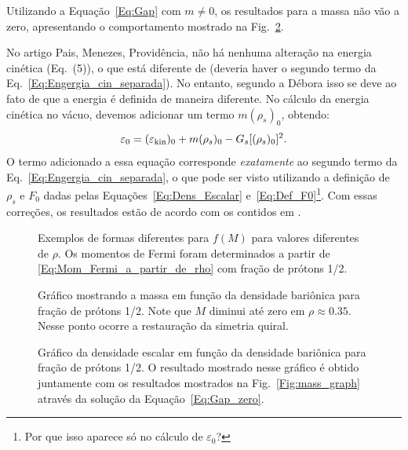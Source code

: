 Utilizando a Equação~\ref{Eq:Gap} com $m \neq 0$, os resultados para a massa não vão a zero, apresentando o comportamento mostrado na Fig.~\ref{Fig:mass_graph_eNJL1m}.

No artigo Pais, Menezes, Providência, não há nenhuma alteração na energia cinética (Eq.~(5)), o que está diferente de \textcite{PRC_68_035804_2003} (deveria haver o segundo termo da Eq.~\eqref{Eq:Engergia_cin_separada}). No entanto, segundo a Débora isso se deve ao fato de que a energia é definida de maneira diferente. No cálculo da energia cinética no vácuo, devemos adicionar um termo $m (\rho_s)_0$, obtendo:
\begin{equation}
	\varepsilon_0 = (\varepsilon_{\rm{kin}})_0 + m (\rho_s)_0 - G_s [(\rho_s)_0]^2.
\end{equation}
%
O termo adicionado a essa equação corresponde \emph{exatamente} ao segundo termo da Eq.~\eqref{Eq:Engergia_cin_separada}, o que pode ser visto utilizando a definição de $\rho_s$ e $F_0$ dadas pelas Equações~\eqref{Eq:Dens_Escalar} e~\eqref{Eq:Def_F0}\footnote{Por que isso aparece só no cálculo de $\varepsilon_0$?}. Com essas correções, os resultados estão de acordo com os contidos em \textcite{Pais}.

\vspace{1cm}

\begin{figure}
	
	\caption{Exemplos de formas diferentes para $f(M)$ para valores diferentes de $\rho$. Os momentos de Fermi foram determinados a partir de \eqref{Eq:Mom_Fermi_a_partir_de_rho} com fração de prótons 1/2. \protect}
	\label{Fig:Gap_zero_graph_eNJL1m}
\end{figure}

\begin{figure}
	
	\caption{Gráfico mostrando a massa em função da densidade bariônica para fração de prótons 1/2. Note que $M$ diminui até zero em $\rho \approx 0.35$. Nesse ponto ocorre a restauração da simetria quiral. \protect}
	\label{Fig:mass_graph_eNJL1m}
\end{figure}

\begin{figure}
	
	\caption{Gráfico da densidade escalar em função da densidade bariônica para fração de prótons 1/2. O resultado mostrado nesse gráfico é obtido juntamente com os resultados mostrados na Fig.~\ref{Fig:mass_graph} através da solução da Equação~\ref{Eq:Gap_zero}. \protect}
	\label{Fig:scalar_density_graph_eNJL1m}
\end{figure}

